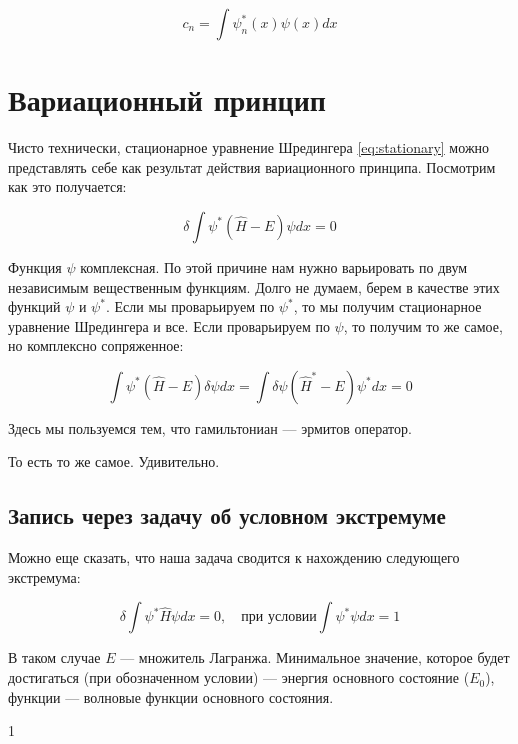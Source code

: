 \documentclass[a4paper, 12pt]{article}
\begin{document}
\begin{equation*}
	c_n = \int \psi_n^*(x) \psi(x) dx
\end{equation*}

\newpage

\section{Вариационный принцип}

Чисто технически, стационарное уравнение Шредингера \ref{eq:stationary} можно представлять себе как результат действия вариационного принципа. Посмотрим как это получается:

\begin{equation*}
	\delta \int \psi^* (\hat{H} - E) \psi dx = 0
\end{equation*}

Функция $\psi$ комплексная. По этой причине нам нужно варьировать по двум независимым вещественным функциям. Долго не думаем, берем в качестве этих функций $\psi$ и $\psi^*$. Если мы проварьируем по $\psi^*$, то мы получим стационарное уравнение Шредингера и все. Если проварьируем по $\psi$, то получим то же самое, но комплексно сопряженное:

\begin{equation*}
	\int \psi^*(\hat{H} - E) \delta \psi dx = \int \delta \psi (\hat{H}^* - E) \psi^* dx = 0
\end{equation*}

Здесь мы пользуемся тем, что гамильтониан --- эрмитов оператор.

То есть то же самое. Удивительно.

\subsection{Запись через задачу об условном экстремуме}

Можно еще сказать, что наша задача сводится к нахождению следующего экстремума:

\begin{equation*}
	\delta \int \psi^* \hat{H} \psi dx = 0, \quad \text{при условии} \int\psi^* \psi dx = 1
\end{equation*}

В таком случае $E$ --- множитель Лагранжа. Минимальное значение, которое будет достигаться (при обозначенном условии) --- энергия основного состояние ($E_0$), функции --- волновые функции основного состояния.

\newpage

1
\end{document}
